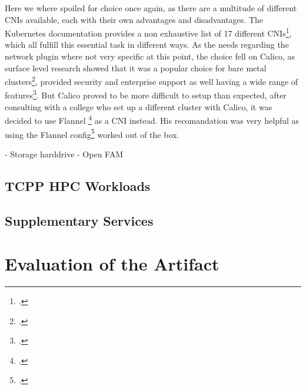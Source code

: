 Here we where spoiled for choice once again, as there are a multitude of different \ac{CNI}s available, each with their own advantages and disadvantages.
The Kubernetes documentation provides a non exhaustive list of 17 different \ac{CNI}s\footcite{KubernetesCNIPlugins}, which all fulfill this essential task in different ways.
As the needs regarding the network plugin where not very specific at this point, the choice fell on Calico, as surface level research showed that it was a popular choice for bare metal clusters\footcite{ExploreNetworkPlugins},
provided security and enterprise support as well having a wide range of features\footcite{mehndirattaComparingKubernetesContainer}.
But Calico proved to be more difficult to setup than expected, after consulting with a college who set up a different cluster with Calico,
it was decided to use Flannel \footcite{Flannel2023} as a \ac{CNI} instead.
His recomandation was very helpful as using the Flannel config\footcite{FlannelInstallConfig} worked out of the box.



- Storage harddrive
- Open FAM

\subsection{\ac{TCPP} HPC Workloads} 
\label{tcpp_hpc_workloads}

\subsection{Supplementary Services}



\newpage    


\section{Evaluation of the Artifact}

\newpage
